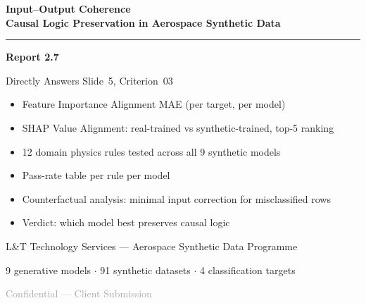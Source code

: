 \documentclass[12pt,a4paper]{article}
\begin{document}

\begin{titlepage}
\centering
\vspace*{2cm}
{\fontsize{28}{34}\selectfont\bfseries\color{primary}
  Input--Output Coherence\\[0.3em]
  \large\color{darkgray} Causal Logic Preservation in Aerospace Synthetic Data
}\par
\vspace{1.2cm}
\textcolor{accent}{\rule{10cm}{2pt}}\par
\vspace{0.8cm}
{\Large\bfseries Report 2.7}\par
\vspace{0.4cm}
{\large\color{darkgray} Directly Answers Slide~5, Criterion~03}\par
\vspace{1.8cm}

\begin{tcolorbox}[insightbox, title={Report Scope}, width=12cm]
\begin{itemize}[noitemsep]
  \item Feature Importance Alignment MAE (per target, per model)
  \item SHAP Value Alignment: real-trained vs synthetic-trained, top-5 ranking
  \item 12 domain physics rules tested across all 9 synthetic models
  \item Pass-rate table per rule per model
  \item Counterfactual analysis: minimal input correction for misclassified rows
  \item Verdict: which model best preserves causal logic
\end{itemize}
\end{tcolorbox}

\vspace{1.8cm}
{\large L\&T Technology Services --- Aerospace Synthetic Data Programme}\par
\vspace{0.3cm}
{\normalsize\color{darkgray} 9 generative models $\cdot$ 91 synthetic datasets $\cdot$ 4 classification targets}\par
\vfill
\textcolor{darkgray}{\small Confidential --- Client Submission}
\end{titlepage}
\end{document}
